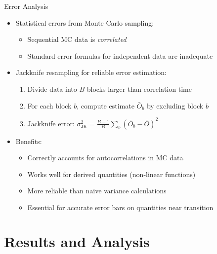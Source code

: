 \documentclass[11pt,aspectratio=169]{beamer}
\begin{document}
\begin{frame}{Error Analysis}
    \begin{itemize}
        \item Statistical errors from Monte Carlo sampling:
        \begin{itemize}
            \item Sequential MC data is \textit{correlated}
            \item Standard error formulas for independent data are inadequate
        \end{itemize}
        \pause
        \item Jackknife resampling for reliable error estimation:
        \begin{enumerate}
            \item Divide data into $B$ blocks larger than correlation time
            \item For each block $b$, compute estimate $\bar{O}_b$ by excluding block $b$
            \item Jackknife error: $\sigma^2_{\text{JK}} = \frac{B-1}{B}\sum_b (\bar{O}_b - \bar{O})^2$
        \end{enumerate}
        \pause
        \item Benefits:
        \begin{itemize}
            \item Correctly accounts for autocorrelations in MC data
            \item Works well for derived quantities (non-linear functions)
            \item More reliable than naive variance calculations
            \item Essential for accurate error bars on quantities near transition
        \end{itemize}
    \end{itemize}
\end{frame}

\section{Results and Analysis}
\end{document}
